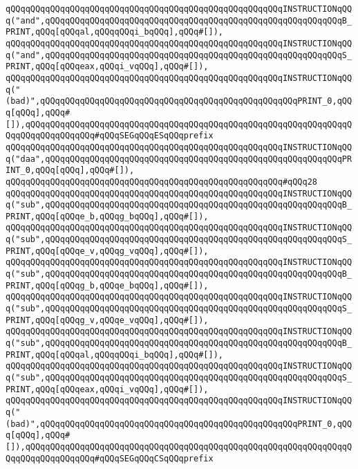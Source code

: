 \verb|qQQqqQQqqQQqqQQqqQQqqQQqqQQqqQQqqQQqqQQqqQQqqQQqqQQqqQQqINSTRUCTIONqQQq("and",qQQqqQQqqQQqqQQqqQQqqQQqqQQqqQQqqQQqqQQqqQQqqQQqqQQqqQQqqQQqB_PRINT,qQQq[qQQqal,qQQqqQQqi_bqQQq],qQQq#[]),|\newline
\verb|qQQqqQQqqQQqqQQqqQQqqQQqqQQqqQQqqQQqqQQqqQQqqQQqqQQqqQQqINSTRUCTIONqQQq("and",qQQqqQQqqQQqqQQqqQQqqQQqqQQqqQQqqQQqqQQqqQQqqQQqqQQqqQQqqQQqS_PRINT,qQQq[qQQqeax,qQQqi_vqQQq],qQQq#[]),|\newline
\verb|qQQqqQQqqQQqqQQqqQQqqQQqqQQqqQQqqQQqqQQqqQQqqQQqqQQqqQQqINSTRUCTIONqQQq("(bad)",qQQqqQQqqQQqqQQqqQQqqQQqqQQqqQQqqQQqqQQqqQQqqQQqqQQqPRINT_0,qQQq[qQQq],qQQq#[]),qQQqqQQqqQQqqQQqqQQqqQQqqQQqqQQqqQQqqQQqqQQqqQQqqQQqqQQqqQQqqQQqqQQqqQQqqQQqqQQqqQQq#qQQqSEGqQQqESqQQqprefix|\newline
\verb|qQQqqQQqqQQqqQQqqQQqqQQqqQQqqQQqqQQqqQQqqQQqqQQqqQQqqQQqINSTRUCTIONqQQq("daa",qQQqqQQqqQQqqQQqqQQqqQQqqQQqqQQqqQQqqQQqqQQqqQQqqQQqqQQqqQQqPRINT_0,qQQq[qQQq],qQQq#[]),|\newline
\verb|qQQqqQQqqQQqqQQqqQQqqQQqqQQqqQQqqQQqqQQqqQQqqQQqqQQqqQQq#qQQq28|\newline
\verb|qQQqqQQqqQQqqQQqqQQqqQQqqQQqqQQqqQQqqQQqqQQqqQQqqQQqqQQqINSTRUCTIONqQQq("sub",qQQqqQQqqQQqqQQqqQQqqQQqqQQqqQQqqQQqqQQqqQQqqQQqqQQqqQQqqQQqB_PRINT,qQQq[qQQqe_b,qQQqg_bqQQq],qQQq#[]),|\newline
\verb|qQQqqQQqqQQqqQQqqQQqqQQqqQQqqQQqqQQqqQQqqQQqqQQqqQQqqQQqINSTRUCTIONqQQq("sub",qQQqqQQqqQQqqQQqqQQqqQQqqQQqqQQqqQQqqQQqqQQqqQQqqQQqqQQqqQQqS_PRINT,qQQq[qQQqe_v,qQQqg_vqQQq],qQQq#[]),|\newline
\verb|qQQqqQQqqQQqqQQqqQQqqQQqqQQqqQQqqQQqqQQqqQQqqQQqqQQqqQQqINSTRUCTIONqQQq("sub",qQQqqQQqqQQqqQQqqQQqqQQqqQQqqQQqqQQqqQQqqQQqqQQqqQQqqQQqqQQqB_PRINT,qQQq[qQQqg_b,qQQqe_bqQQq],qQQq#[]),|\newline
\verb|qQQqqQQqqQQqqQQqqQQqqQQqqQQqqQQqqQQqqQQqqQQqqQQqqQQqqQQqINSTRUCTIONqQQq("sub",qQQqqQQqqQQqqQQqqQQqqQQqqQQqqQQqqQQqqQQqqQQqqQQqqQQqqQQqqQQqS_PRINT,qQQq[qQQqg_v,qQQqe_vqQQq],qQQq#[]),|\newline
\verb|qQQqqQQqqQQqqQQqqQQqqQQqqQQqqQQqqQQqqQQqqQQqqQQqqQQqqQQqINSTRUCTIONqQQq("sub",qQQqqQQqqQQqqQQqqQQqqQQqqQQqqQQqqQQqqQQqqQQqqQQqqQQqqQQqqQQqB_PRINT,qQQq[qQQqal,qQQqqQQqi_bqQQq],qQQq#[]),|\newline
\verb|qQQqqQQqqQQqqQQqqQQqqQQqqQQqqQQqqQQqqQQqqQQqqQQqqQQqqQQqINSTRUCTIONqQQq("sub",qQQqqQQqqQQqqQQqqQQqqQQqqQQqqQQqqQQqqQQqqQQqqQQqqQQqqQQqqQQqS_PRINT,qQQq[qQQqeax,qQQqi_vqQQq],qQQq#[]),|\newline
\verb|qQQqqQQqqQQqqQQqqQQqqQQqqQQqqQQqqQQqqQQqqQQqqQQqqQQqqQQqINSTRUCTIONqQQq("(bad)",qQQqqQQqqQQqqQQqqQQqqQQqqQQqqQQqqQQqqQQqqQQqqQQqqQQqPRINT_0,qQQq[qQQq],qQQq#[]),qQQqqQQqqQQqqQQqqQQqqQQqqQQqqQQqqQQqqQQqqQQqqQQqqQQqqQQqqQQqqQQqqQQqqQQqqQQqqQQqqQQq#qQQqSEGqQQqCSqQQqprefix|\newline
